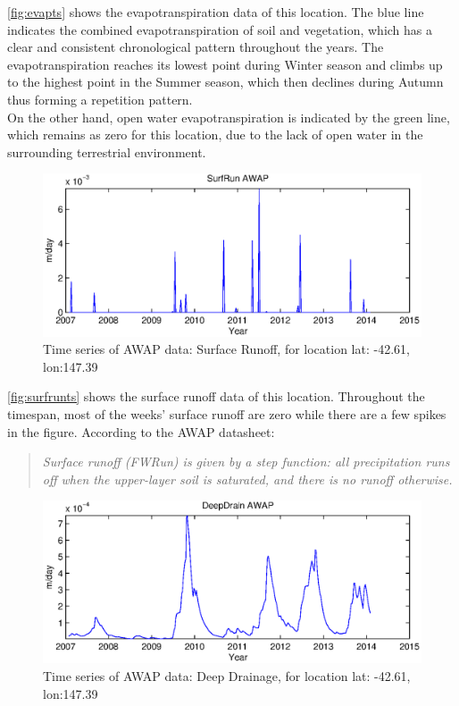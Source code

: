 \newline
\autoref{fig:evapts} shows the evapotranspiration data of this location. The blue line indicates the combined evapotranspiration of soil and vegetation, which has a clear and consistent chronological pattern throughout the years. The evapotranspiration reaches its lowest point during Winter season and climbs up to the highest point in the Summer season, which then declines during Autumn thus forming a repetition pattern. \\
On the other hand, open water evapotranspiration is indicated by the green line, which remains as zero for this location, due to the lack of open water in the surrounding terrestrial environment.\\
\begin{figure}[hbt]
\begin{center}
\includegraphics[width=\linewidth]{gfx/surfrunts.eps}
\end{center}
\caption{Time series of AWAP data: Surface Runoff, for location lat: -42.61, lon:147.39}
\label{fig:surfrunts}
\end{figure}
\newline
\autoref{fig:surfrunts} shows the surface runoff data of this location. Throughout the timespan, most of the weeks' surface runoff are zero while there are a few spikes in the figure. According to the AWAP datasheet\citep{Raupach2009}:
\begin{quote}
\emph{Surface runoff (FWRun) is given by a step function: all precipitation runs off when the upper-layer soil is saturated, and there is no runoff otherwise.}
\end{quote}
\begin{figure}[hbt]
\begin{center}
\includegraphics[width=\linewidth]{gfx/deepdraints.eps}
\end{center}
\caption{Time series of AWAP data: Deep Drainage, for location lat: -42.61, lon:147.39}
\label{fig:deepdraints}
\end{figure}
